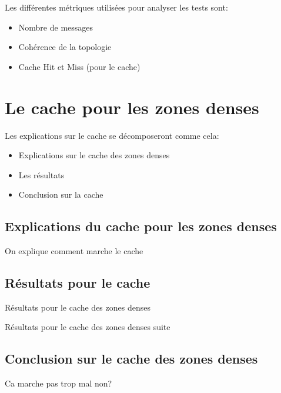 \documentclass{beamer}
\begin{document}
  \begin{frame}
	Les différentes métriques utilisées pour analyser les tests sont:
	\begin{itemize}
		\item Nombre de messages
		\item Cohérence de la topologie
		\item Cache Hit et Miss (pour le cache)
	\end{itemize}
  \end{frame}

  \section{Le cache pour les zones denses}
  \begin{frame}
	Les explications sur le cache se décomposeront comme cela:
	\begin{itemize}
		\item Explications sur le cache des zones denses
		\item Les résultats 
		\item Conclusion sur la cache
	\end{itemize}
  \end{frame}
  
  \subsection{Explications du cache pour les zones denses}
  \begin{frame}
	On explique comment marche le cache
  \end{frame}
  
  \subsection{Résultats pour le cache}
  \begin{frame}
	Résultats pour le cache des zones denses
  \end{frame}

  \begin{frame}
	Résultats pour le cache des zones denses suite
  \end{frame}
	
  \subsection{Conclusion sur le cache des zones denses}
  \begin{frame}
	Ca marche pas trop mal non?
  \end{frame}
\end{document}
